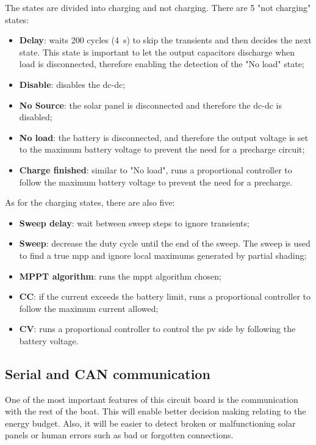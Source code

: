         The states are divided into charging and not charging. There are 5 "not charging" states:
        \begin{itemize}[leftmargin=4em, itemsep=1pt, topsep=2pt]
            \item \textbf{Delay}: waits 200 cycles (4~s) to skip the transients and then decides the next state. This state is important to let the output capacitors discharge when load is disconnected, therefore enabling the detection of the "No load" state;
            \item \textbf{Disable}: disables the \acs{dc}-\acs{dc};
            \item \textbf{No Source}: the solar panel is disconnected and therefore the \acs{dc}-\acs{dc} is disabled;
            \item \textbf{No load}: the battery is disconnected, and therefore the output voltage is set to the maximum battery voltage to prevent the need for a precharge circuit;
            \item \textbf{Charge finished}: similar to "No load", runs a proportional controller to follow the maximum battery voltage to prevent the need for a precharge.
        \end{itemize} 

        As for the charging states, there are also five:
        \begin{itemize}[leftmargin=4em, itemsep=1pt, topsep=2pt]
            \item \textbf{Sweep delay}: wait between sweep steps to ignore transients;
            \item \textbf{Sweep}: decrease the duty cycle until the end of the sweep. The sweep is used to find a true \ac{mpp} and ignore local maximums generated by partial shading;
            \item \textbf{MPPT algorithm}: runs the \ac{mppt} algorithm chosen;
            \item \textbf{CC}: if the current exceeds the battery limit, runs a proportional controller to follow the maximum current allowed;
            \item \textbf{CV}: runs a proportional controller to control the \acs{pv} side by following the battery voltage.
        \end{itemize}


    \subsection{Serial and CAN communication}
        One of the most important features of this circuit board is the communication with the rest of the boat. This will enable better decision making relating to the energy budget. Also, it will be easier to detect broken or malfunctioning solar panels or human errors such as bad or forgotten connections.

